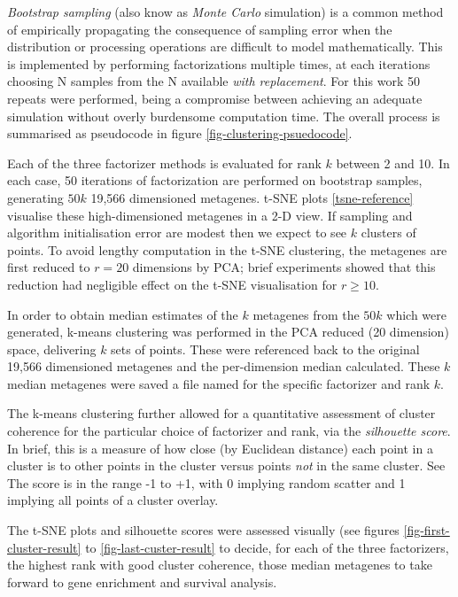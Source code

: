 \documentclass[draft, tikz, 12pt,a4paper,oneside,fleqn]{article}
\begin{document}
\emph{Bootstrap sampling} (also know as \emph{Monte Carlo} simulation) is a common method of empirically propagating the consequence of sampling error when the distribution or processing operations are difficult to model mathematically.   This is implemented by performing factorizations multiple times, at each iterations choosing N samples from the N available \emph{with replacement}.   For this work 50 repeats were performed, being a compromise between achieving an adequate simulation without overly burdensome computation time.  The overall process is summarised as pseudocode in figure \ref{fig-clustering-psuedocode}.  

Each of the three factorizer methods is evaluated for rank $k$ between 2 and 10.  In each case, 50 iterations of factorization are performed on bootstrap samples, generating $50 k$ 19,566 dimensioned metagenes.   t-SNE plots \ref{tsne-reference} visualise these high-dimensioned metagenes in a 2-D view.   If sampling and algorithm initialisation error are modest then we expect to see $k$ clusters of points.   To avoid lengthy computation in the t-SNE clustering, the metagenes are first reduced to $r=20$ dimensions by PCA; brief experiments showed that this reduction had negligible effect on the t-SNE visualisation for $r \geq 10$.

In order to obtain median estimates of the $k$ metagenes from the $50 k$ which were generated, k-means clustering was performed in the PCA reduced (20 dimension) space, delivering $k$ sets of points.  These were referenced back to the original 19,566 dimensioned metagenes and the per-dimension median calculated.  These $k$ median metagenes were saved a file named for the specific factorizer and rank $k$.  

The k-means clustering further allowed for a quantitative assessment of cluster coherence for the particular choice of factorizer and rank, via the \emph{silhouette score}.  In brief, this is a measure of how close (by Euclidean distance) each point in a cluster is to other points in the cluster versus points \emph{not} in the same cluster.  See 
The score is in the range -1 to +1, with 0 implying random scatter and 1 implying all points of a cluster overlay.

The t-SNE plots and silhouette scores were assessed visually (see figures \ref{fig-first-cluster-result} to \ref{fig-last-custer-result} to decide, for each of the three factorizers, the highest rank with good cluster coherence, those median metagenes to take forward to gene enrichment and survival analysis.  
\end{document}
